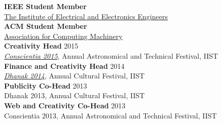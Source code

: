 \documentclass{resume}
\begin{document}
\begin{multicols}{2}
\textbf{IEEE Student Member}\\
\href{http://www.ieee.org/}{The Institute of Electrical and Electronics Engineers}\\[.05in]
\textbf{ACM Student Member}\\
\href{http://www.acm.org/}{Association for Computing Machinery}\\[.05in]
\textbf{Creativity Head} \hfill 2015\\
\href{https://www.facebook.com/conscientia.iist/}{\emph{Conscientia 2015}}, Annual Astronomical and Technical Festival, IIST\\[.05in]
\textbf{Finance and Creativity Head} \hfill 2014\\
\href{https://www.facebook.com/iist.dhanak/}{\emph{Dhanak 2014}}, Annual Cultural Festival, IIST\\[.05in]
\textbf{Publicity Co-Head} \hfill 2013\\
Dhanak 2013, Annual Cultural Festival, IIST\\[.05in]
\textbf{Web and Creativity Co-Head} \hfill 2013\\
Conscientia 2013, Annual Astronomical and Technical Festival, IIST\\


\end{multicols}
\end{document}
